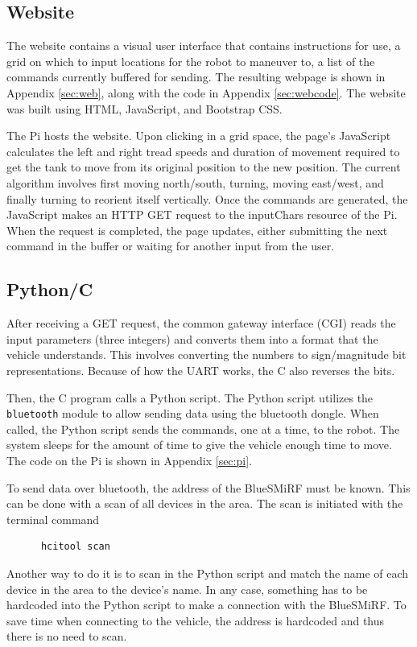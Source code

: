 \documentclass[12pt]{article}
\begin{document}
\subsection{Website}

The website contains a visual user interface that contains instructions for use, a grid on which to input locations for the robot to maneuver to, a list of the commands currently buffered for sending. The resulting webpage is shown in Appendix \ref{sec:web}, along with the code in Appendix \ref{sec:webcode}. The website was built using HTML, JavaScript, and Bootstrap CSS. 

The Pi hosts the website. Upon clicking in a grid space, the page's JavaScript calculates the left and right tread speeds and duration of movement required to get the tank to move from its original position to the new position. The current algorithm involves first moving north/south, turning, moving east/west, and finally turning to reorient itself vertically. Once the commands are generated, the JavaScript makes an HTTP GET request to the inputChars resource of the Pi. When the request is completed, the page updates, either submitting the next command in the buffer or waiting for another input from the user.

\subsection{Python/C}
After receiving a GET request, the common gateway interface (CGI) reads the input parameters (three integers) and converts them into a format that the vehicle understands. This involves converting the numbers to sign/magnitude bit representations. Because of how the UART works, the C also reverses the bits.

Then, the C program calls a Python script. The Python script utilizes the \verb.bluetooth. module to allow sending data using the bluetooth dongle. When called, the Python script sends the commands, one at a time, to the robot. The system sleeps for the amount of time to give the vehicle enough time to move. The code on the Pi is shown in Appendix \ref{sec:pi}. 

To send data over bluetooth, the address of the BlueSMiRF must be known. This can be done with a scan of all devices in the area. The scan is initiated with the terminal command
\begin{verbatim}
      hcitool scan
\end{verbatim}
Another way to do it is to scan in the Python script and match the name of each device in the area to the device's name. In any case, something has to be hardcoded into the Python script to make a connection with the BlueSMiRF. To save time when connecting to the vehicle, the address is hardcoded and thus there is no need to scan.
\end{document}
